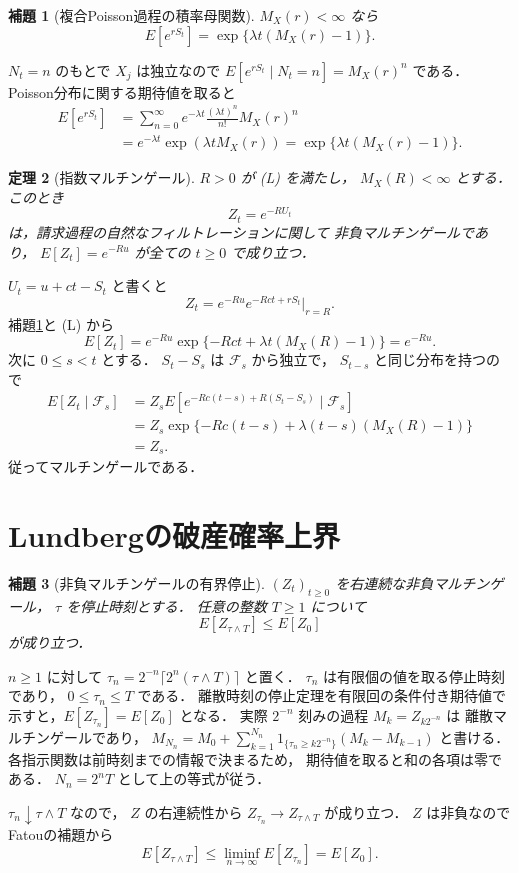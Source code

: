\documentclass[a5paper,10pt,onecolumn]{jsarticle}
\makeatletter
\theoremstyle{mathnotetheorem}
\newtheorem{theorem}{定理}[section]
\newtheorem{lemma}[theorem]{補題}
\renewcommand{\proofname}{証明}
\renewenvironment{proof}[1][\proofname]{%
  \par\pushQED{\qed}\normalfont\topsep4\p@\@plus2\p@\relax
  \trivlist\item[\hskip\labelsep\bfseries #1]\ignorespaces
}{\popQED\endtrivlist\@endpefalse}
\makeatother
\begin{document}
\begin{lemma}[複合Poisson過程の積率母関数]
\label{lem:compound-mgf}
$M_X(r)<\infty$ なら
\[
 E[e^{rS_t}]
 =\exp\{\lambda t(M_X(r)-1)\}.
\]
\end{lemma}
\begin{proof}
$N_t=n$ のもとで $X_j$ は独立なので
$E[e^{rS_t}\mid N_t=n]=M_X(r)^n$ である．
Poisson分布に関する期待値を取ると
\begin{align*}
 E[e^{rS_t}]
 &=\sum_{n=0}^\infty
 e^{-\lambda t}\frac{(\lambda t)^n}{n!}M_X(r)^n\\
 &=e^{-\lambda t}
   \exp(\lambda tM_X(r))
 =\exp\{\lambda t(M_X(r)-1)\}.
\end{align*}
\end{proof}

\begin{theorem}[指数マルチンゲール]\label{thm:exp-mart}
$R>0$ が (L) を満たし，
$M_X(R)<\infty$ とする．
このとき
\[
 Z_t=e^{-RU_t}
\]
は，請求過程の自然なフィルトレーションに関して
非負マルチンゲールであり，
$E[Z_t]=e^{-Ru}$ が全ての $t\ge0$ で成り立つ．
\end{theorem}
\begin{proof}
$U_t=u+ct-S_t$ と書くと
\[
 Z_t=e^{-Ru}e^{-Rct+rS_t}\big|_{r=R}.
\]
補題\ref{lem:compound-mgf}と (L) から
\[
 E[Z_t]
 =e^{-Ru}\exp\{-Rct+\lambda t(M_X(R)-1)\}
 =e^{-Ru}.
\]
次に $0\le s<t$ とする．
$S_t-S_s$ は $\mathcal F_s$ から独立で，
$S_{t-s}$ と同じ分布を持つので
\begin{align*}
 E[Z_t\mid\mathcal F_s]
 &=Z_sE[e^{-Rc(t-s)+R(S_t-S_s)}\mid\mathcal F_s]\\
 &=Z_s\exp\{-Rc(t-s)
       +\lambda(t-s)(M_X(R)-1)\}\\
 &=Z_s.
\end{align*}
従ってマルチンゲールである．
\end{proof}

\section{Lundbergの破産確率上界}

\begin{lemma}[非負マルチンゲールの有界停止]
\label{lem:bounded-stop}
$(Z_t)_{t\ge0}$ を右連続な非負マルチンゲール，
$\tau$ を停止時刻とする．
任意の整数 $T\ge1$ について
\[
 E[Z_{\tau\wedge T}]\le E[Z_0]
\]
が成り立つ．
\end{lemma}
\begin{proof}
$n\ge1$ に対して
$\tau_n=2^{-n}\lceil2^n(\tau\wedge T)\rceil$
と置く．
$\tau_n$ は有限個の値を取る停止時刻であり，
$0\le\tau_n\le T$ である．
離散時刻の停止定理を有限回の条件付き期待値で
示すと，$E[Z_{\tau_n}]=E[Z_0]$ となる．
実際 $2^{-n}$ 刻みの過程 $M_k=Z_{k2^{-n}}$ は
離散マルチンゲールであり，
$M_{N_n}=M_0+
 \sum_{k=1}^{N_n}1_{\{\tau_n\ge k2^{-n}\}}
 (M_k-M_{k-1})$ と書ける．
各指示関数は前時刻までの情報で決まるため，
期待値を取ると和の各項は零である．
$N_n=2^nT$ として上の等式が従う．

$\tau_n\downarrow\tau\wedge T$ なので，
$Z$ の右連続性から
$Z_{\tau_n}\to Z_{\tau\wedge T}$ が成り立つ．
$Z$ は非負なのでFatouの補題から
\[
 E[Z_{\tau\wedge T}]
 \le\liminf_{n\to\infty}E[Z_{\tau_n}]
 =E[Z_0].
\]
\end{proof}
\end{document}
